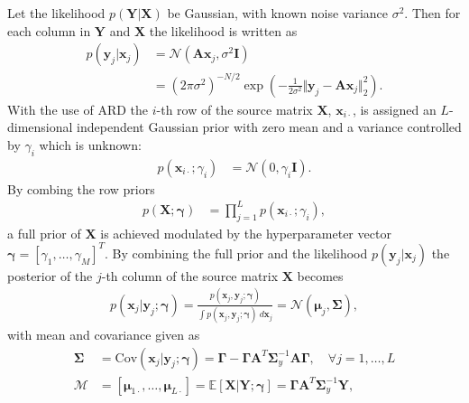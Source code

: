 Let the likelihood $p(\mathbf{Y} \vert \mathbf{X})$ be Gaussian, with known noise variance $\sigma^2$. 
Then for each column in $\mathbf{Y}$ and $\mathbf{X}$ the likelihood is written as
\begin{align*}
p(\mathbf{y}_{j} \vert \mathbf{x}_{j}) &= \mathcal{N}(\mathbf{Ax}_{j}, \sigma^2 \mathbf{I}) \\
&= (2 \pi \sigma^2)^{-N/2} \exp \left( - \frac{1}{2 \sigma^2} \Vert \mathbf{y}_{j} - \mathbf{A} \mathbf{x}_{j} \Vert_2^2 \right).
\end{align*}
With the use of ARD the $i$-th row of the source matrix $\mathbf{X}$, $\mathbf{x}_{i \cdot}$, is assigned an $L$-dimensional independent Gaussian prior with zero mean and a variance controlled by $\gamma_i$ which is unknown:
\begin{align*}
p (\mathbf{x}_{i \cdot} ; \gamma_i) &= \mathcal{N}(0, \gamma_i \mathbf{I}).
\end{align*}
By combing the row priors
\begin{align*}
p (\mathbf{X} ; \boldsymbol{\gamma}) &= \prod_{j=1}^L p (\mathbf{x}_{i \cdot} ; \gamma_i),
\end{align*}
a full prior of $\mathbf{X}$ is achieved modulated by the hyperparameter vector $\boldsymbol{\gamma} = [\gamma_1, \dots, \gamma_M]^T$. 
By combining the full prior and the likelihood $p(\mathbf{y}_{j} \vert \mathbf{x}_{j})$ the posterior of the $j$-th column of the source matrix $\mathbf{X}$ becomes 
\begin{align*}
p(\mathbf{x}_{j} \vert \mathbf{y}_{j} ; \boldsymbol{\gamma}) = \frac{p(\mathbf{x}_{j}, \mathbf{y}_{j} ; \boldsymbol{\gamma})}{\int p(\mathbf{x}_{j}, \mathbf{y}_{j} ; \boldsymbol{\gamma}) \ d \mathbf{x}_{j}} = \mathcal{N}(\boldsymbol{\mu}_{j}, \boldsymbol{\Sigma}),
\end{align*}
with mean and covariance given as
\begin{align}
\boldsymbol{\Sigma} &= \text{Cov}(\mathbf{x}_{j} \vert \mathbf{y}_{j} ; \boldsymbol{\gamma}) = \boldsymbol{\Gamma} - \boldsymbol{\Gamma} \mathbf{A}^T \boldsymbol{\Sigma}_y^{-1} \mathbf{A} \boldsymbol{\Gamma}, \quad \forall j = 1, \dots, L \nonumber \\
\mathcal{M} &= [\boldsymbol{\mu}_{1 \cdot}, \dots, \boldsymbol{\mu}_{ L \cdot}] = \mathbb{E}[\mathbf{X} \vert \mathbf{Y} ; \boldsymbol{\gamma}] = \boldsymbol{\Gamma} \mathbf{A}^T \boldsymbol{\Sigma}_y^{-1} \mathbf{Y}, \label{eq:moments}
\end{align}
